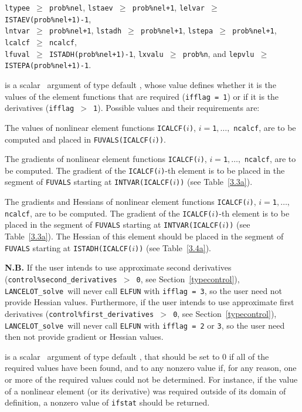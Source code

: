 \documentclass{galahad}
\newcommand{\fullpackagename}{LANC\-E\-LOT}
\newcommand{\solver}{{\tt \fullpackagename\_solve}}
\begin{document}
\begin{description}
\restrictions
{\tt ltypee $\geq$ prob\%nel},
{\tt lstaev $\geq$ prob\%nel+1},
{\tt lelvar $\geq$ ISTAEV(prob\%nel+1)-1}, \\
{\tt lntvar $\geq$ prob\%nel+1},
{\tt lstadh $\geq$ prob\%nel+1},
{\tt lstepa $\geq$ prob\%nel+1},
{\tt lcalcf $\geq$ ncalcf}, \\
{\tt lfuval $\geq$ ISTADH(prob\%nel+1)-1},
{\tt lxvalu $\geq$ prob\%n}, and
{\tt lepvlu $\geq$ ISTEPA(prob\%nel+1)-1}.

 is a scalar \intentin\ argument of type default \integer,
whose value defines whether it is the values of the element functions
that are required ({\tt ifflag = 1}) or if it is the derivatives
({\tt ifflag $>$ 1}). Possible values and their requirements are:
\begin{description}

 The values of nonlinear element functions
{\tt ICALCF($i$)}, $i = ${\tt 1}$, \ldots ,$ {\tt ncalcf}, are to be computed
and placed in {\tt FUVALS(ICALCF($i$))}.

 The gradients of nonlinear element functions
{\tt ICALCF($i$)}, $i = ${\tt 1}$, \ldots ,$ {\tt ncalcf}, are to be computed.
The gradient of the {\tt ICALCF($i$)}-th element is to be placed in
the segment of {\tt FUVALS} starting at {\tt INTVAR(ICALCF($i$))}
(see Table~\ref{3.3a}).

 The gradients and Hessians
of nonlinear element functions
{\tt ICALCF($i$)}, $i = ${\tt 1}$, \ldots ,$ {\tt ncalcf}, are to be computed.
The gradient of the {\tt ICALCF($i$)}-th element is to be placed in
the segment of {\tt FUVALS} starting at {\tt INTVAR(ICALCF($i$))}
(see Table~\ref{3.3a}).
The Hessian of this element should be placed in
the segment of {\tt FUVALS} starting at {\tt ISTADH(ICALCF($i$))}
(see Table~\ref{3.4a}).

\end{description}
{\bf N.B.} If the user intends to use approximate second derivatives
({\tt control\%second\_derivatives $>$ 0}, see Section~\ref{typecontrol}),
\solver\ will never call {\tt ELFUN} with {\tt ifflag = 3}, so the
user need not provide Hessian values. Furthermore, if the user
intends to use approximate first derivatives
({\tt control\%first\_derivatives $>$ 0}, see Section~\ref{typecontrol}),
\solver\ will never call {\tt ELFUN} with {\tt ifflag = 2} or {\tt 3}, so the
user need then not provide gradient or Hessian values.

 is a scalar \intentout\ argument of type default \integer,
that should be set to 0 if all of the required values have been found,
and to any nonzero value if, for any reason, one or more of the required
values could not be determined. For instance, if the value of a
nonlinear element (or its derivative) was required outside of its domain of
definition, a nonzero value of {\tt ifstat} should be returned.

\end{description}
\end{document}
